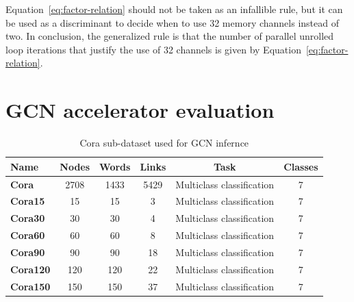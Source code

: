 Equation~\ref{eq:factor-relation} should not be taken as an infallible rule, but it can be used as a discriminant to decide when to use 32 memory channels instead of two.
In conclusion, the generalized rule is that the number of parallel unrolled loop iterations that justify the use of 32 channels is given by Equation~\ref{eq:factor-relation}.

\section{GCN accelerator evaluation}
\label{sec:gcn_accelerator_evaluation}%

\begin{table}[t]
\centering
    \begin{tabular}{|p{4em} c c c c c|}
    \hline
    \textbf{Name} & \textbf{Nodes} & \textbf{Words} & \textbf{Links} & \textbf{Task} & \textbf{Classes} \T\B \\
    \hline \hline
    \textbf{Cora} & 2708  & 1433 & 5429 & Multiclass classification & 7 \T\B\\
    \hline
    \textbf{Cora15} & 15  & 15 & 3 & Multiclass classification & 7 \T\B\\
    \hline
    \textbf{Cora30} & 30  & 30 & 4 & Multiclass classification & 7 \T\B\\
    \hline
    \textbf{Cora60} & 60  & 60 & 8 & Multiclass classification & 7 \T\B\\
    \hline
    \textbf{Cora90} & 90  & 90 & 18 & Multiclass classification & 7 \T\B\\
    \hline
    \textbf{Cora120} & 120  & 120 & 22 & Multiclass classification & 7 \T\B\\
    \hline
    \textbf{Cora150} & 150  & 150 & 37 & Multiclass classification & 7 \T\B\\
    \hline
    \end{tabular}
    \\[10pt]
    \caption{Cora sub-dataset used for GCN infernce}
    \label{tab:dataset-definition}
\end{table}


